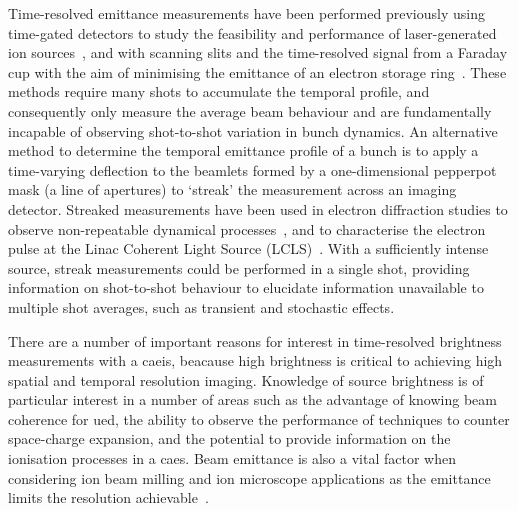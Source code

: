 Time-resolved emittance measurements have been performed previously using time-gated detectors to study the feasibility and performance of laser-generated ion sources~\cite{collier_cern_1996,yoshida_simple_2001}, and with scanning slits and the time-resolved signal from a Faraday cup with the aim of minimising the emittance of an electron storage ring~\cite{walter_time_2003}.
These methods require many shots to accumulate the temporal profile, and consequently only measure the average beam behaviour and are fundamentally incapable of observing shot-to-shot variation in bunch dynamics.
An alternative method to determine the temporal emittance profile of a bunch is to apply a time-varying deflection to the beamlets formed by a one-dimensional pepperpot mask (a line of apertures) to `streak' the measurement across an imaging detector.
Streaked measurements have been used in electron diffraction studies to observe non-repeatable dynamical processes~\cite{li_note:_2010, mukojima_streak-camera_2015}, and to characterise the electron pulse at the Linac Coherent Light Source (LCLS)~\cite{ratner_time-resolved_2015}.
With a sufficiently intense source, streak measurements could be performed in a single shot, providing information on shot-to-shot behaviour to elucidate information unavailable to multiple shot averages, such as transient and stochastic effects.

There are a number of important reasons for interest in time-resolved brightness measurements with a \gls{caeis}, beacause high brightness is critical to achieving high spatial and temporal resolution imaging.
Knowledge of source brightness is of particular interest in a number of areas such as the advantage of knowing beam coherence for \gls{ued}, the ability to observe the performance of techniques to counter space-charge expansion, and the potential to provide information on the ionisation processes in a \gls{caes}.
Beam emittance is also a vital factor when considering ion beam milling and ion microscope applications as the emittance limits the resolution achievable~\cite{scipioni_helium_2008,khizroev_focused-ion-beam-based_2004}.

